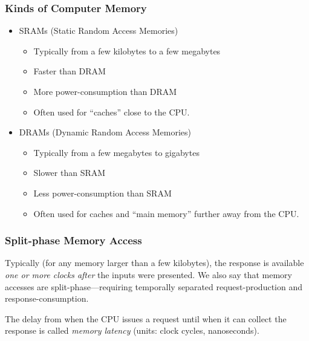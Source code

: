 \begin{frame}
\frametitle{Kinds of Computer Memory}

\footnotesize

\begin{center}
\end{center}

{\footnotesize
\begin{itemize}
 \item SRAMs (Static Random Access Memories)
       \begin{itemize}\footnotesize
        \item Typically from a few kilobytes to a few megabytes
	\item Faster than DRAM
	\item More power-consumption than DRAM
	\item Often used for ``caches'' close to the CPU.
       \end{itemize}

 \item DRAMs (Dynamic Random Access Memories)
       \begin{itemize}\footnotesize
        \item Typically from a few megabytes to gigabytes
	\item Slower than SRAM
	\item Less power-consumption than SRAM
	\item Often used for caches and ``main memory'' further away from the CPU.
       \end{itemize}
\end{itemize}}

\end{frame}


\begin{frame}
\frametitle{Split-phase Memory Access}

\footnotesize

\begin{center}
\end{center}

\vspace*{1ex}

Typically (for any memory larger than a few kilobytes), the response
is available \emph{one or more clocks after} the inputs were
presented.  We also say that memory accesses are
\alert{split-phase}---requiring temporally separated request-production
and response-consumption.

\vspace*{1ex}

\PAUSE{\vspace{1ex}}

The delay from when the CPU issues a request until when it can collect
the response is called \emph{memory latency} (units: clock cycles,
nanoseconds).

\end{frame}

